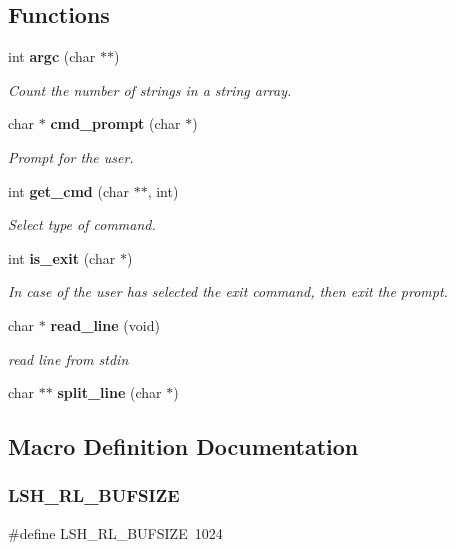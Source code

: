 \subsection*{Functions}
\begin{DoxyCompactItemize}
\item 
int \textbf{ argc} (char $\ast$$\ast$)
\begin{DoxyCompactList}\small\item\em Count the number of strings in a string array. \end{DoxyCompactList}\item 
char $\ast$ \textbf{ cmd\+\_\+prompt} (char $\ast$)
\begin{DoxyCompactList}\small\item\em Prompt for the user. \end{DoxyCompactList}\item 
int \textbf{ get\+\_\+cmd} (char $\ast$$\ast$, int)
\begin{DoxyCompactList}\small\item\em Select type of command. \end{DoxyCompactList}\item 
int \textbf{ is\+\_\+exit} (char $\ast$)
\begin{DoxyCompactList}\small\item\em In case of the user has selected the exit command, then exit the prompt. \end{DoxyCompactList}\item 
char $\ast$ \textbf{ read\+\_\+line} (void)
\begin{DoxyCompactList}\small\item\em read line from stdin \end{DoxyCompactList}\item 
char $\ast$$\ast$ \textbf{ split\+\_\+line} (char $\ast$)
\end{DoxyCompactItemize}


\subsection{Macro Definition Documentation}
\mbox{\label{prompt_8h_acffba4e12894ca7015d00aaf3a2354cc}} 
\subsubsection{L\+S\+H\+\_\+\+R\+L\+\_\+\+B\+U\+F\+S\+I\+ZE}
{\footnotesize\ttfamily \#define L\+S\+H\+\_\+\+R\+L\+\_\+\+B\+U\+F\+S\+I\+ZE~1024}

